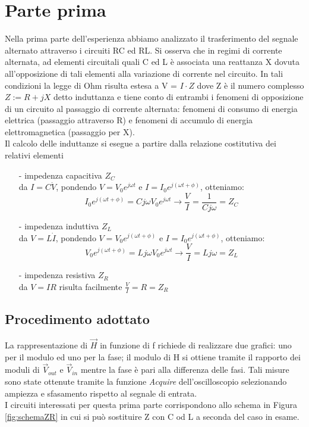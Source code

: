 \documentclass{article}
\theoremstyle{definition}
\begin{document}
\section{Parte prima}
Nella prima parte dell'esperienza abbiamo analizzato il trasferimento del segnale alternato attraverso i circuiti RC ed RL. Si osserva che in regimi di corrente alternata, ad elementi circuitali quali C ed L è associata una reattanza X dovuta all'opposizione di tali elementi alla variazione di corrente nel circuito. In tali condizioni la legge di Ohm risulta estesa a V = \(I \cdot Z\) dove Z è il numero complesso \(Z :=  R + jX\) detto induttanza e tiene conto di entrambi i fenomeni di opposizione di un circuito al passaggio di corrente alternata: fenomeni di consumo di energia elettrica (passaggio attraverso R) e fenomeni di accumulo di energia elettromagnetica (passaggio per X). \\
Il calcolo delle induttanze si esegue a partire dalla relazione costitutiva dei relativi elementi
\begin{enumerate}
    \item[-] impedenza capacitiva \(Z_{C}\) \\
   da \(I = C \dot{V}\), pondendo \(V = V_{0}e^{j\omega t }\) e \(I = I_{0}e^{j(\omega t + \phi)}\), otteniamo: \[ I_{0}e^{j(\omega t + \phi)} = C j\omega V_{0}e^{j\omega t } \rightarrow \frac{V}{I} = \frac{1}{Cj\omega} = Z_{C}\]
   
    \item[-] impedenza induttiva \(Z_{L}\) \\
   da \(V = L \dot{I}\), pondendo \(V = V_{0}e^{j(\omega t + \phi)}\) e \(I = I_{0}e^{j(\omega t + \phi)}\), otteniamo: \[ V_{0}e^{j(\omega t + \phi)} = L j\omega V_{0}e^{j\omega t } \rightarrow \frac{V}{I} = Lj\omega = Z_{L}\]
   
    \item[-] impedenza resistiva \(Z_{R}\) \\
    da \(V = I R\) risulta facilmente \(\frac{V}{I} = R = Z_{R}\)
\end{enumerate}
\subsection{Procedimento adottato}
La rappresentazione di \(\vec{H}\) in funzione di f richiede di realizzare due grafici: uno per il modulo ed uno per la fase; il modulo di H si ottiene tramite il rapporto dei moduli di \(\vec{V}_{out}\) e \(\vec{V}_{in}\) mentre la fase è pari alla differenza delle fasi. Tali misure sono state ottenute tramite la funzione \textit{Acquire} dell'oscilloscopio selezionando ampiezza e sfasamento rispetto al segnale di entrata. \\
I circuiti interessati per questa prima parte corrispondono allo schema in Figura \ref{fig:schemaZR} in cui si può sostituire Z con C od L a seconda del caso in esame. \\
\end{document}
